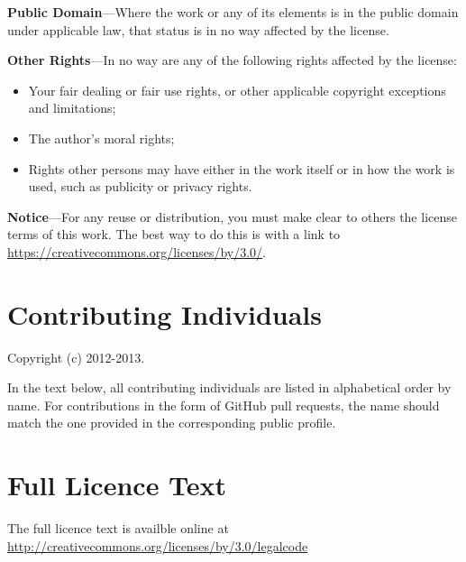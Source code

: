 \documentclass[a4paper,10pt,twoside]{book}
\begin{document}
\noindent \textbf{Public Domain}---Where the work or any of its
elements is in the public domain under applicable law, that status is
in no way affected by the license.

\noindent \textbf{Other Rights}---In no way are any of the following
rights affected by the license:

\begin{itemize}
\item Your fair dealing or fair use rights, or other applicable
copyright exceptions and limitations;

\item The author's moral rights;

\item Rights other persons may have either in the work itself or in
how the work is used, such as publicity or privacy rights.
\end{itemize}

\noindent \textbf{Notice}---For any reuse or distribution, you must make clear to
others the license terms of this work. The best way to do this is with
a link to \url{https://creativecommons.org/licenses/by/3.0/}.

\section{Contributing Individuals}

Copyright (c) 2012-2013.

\noindent In the text below, all contributing individuals are listed in alphabetical order by name. 
For contributions in the form of GitHub pull requests, the name should match the one provided in the corresponding public profile.

\noindent


\section{Full Licence Text}

The full licence text is availble online at 
\url{http://creativecommons.org/licenses/by/3.0/legalcode}




\ifx\wholebook\relax\else
   
   
\end{document}
